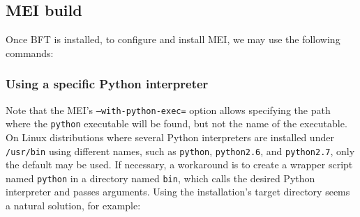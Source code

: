\documentclass[a4paper,10pt,twoside]{article}
\begin{document}
\subsection{MEI build\label{sec:mei:config:examples}}

Once BFT is installed, to configure and install MEI, we may
use the following commands:


\subsubsection{Using a specific Python interpreter%
\label{sec:mei:config:examples:python}}

Note that the MEI's \texttt{--with-python-exec=} option allows specifying
the path where the \texttt{python} executable will be found, but
not the name of the executable. On Linux distributions where several
Python interpreters are installed under \texttt{/usr/bin} using
different names, such as \texttt{python}, \texttt{python2.6},
and \texttt{python2.7}, only the default may be used.
If necessary, a workaround is to create a wrapper script named
\texttt{python} in a directory named \texttt{bin}, which
calls the desired Python interpreter and passes arguments.
Using the installation's target directory seems a natural
solution, for example:

\end{document}
